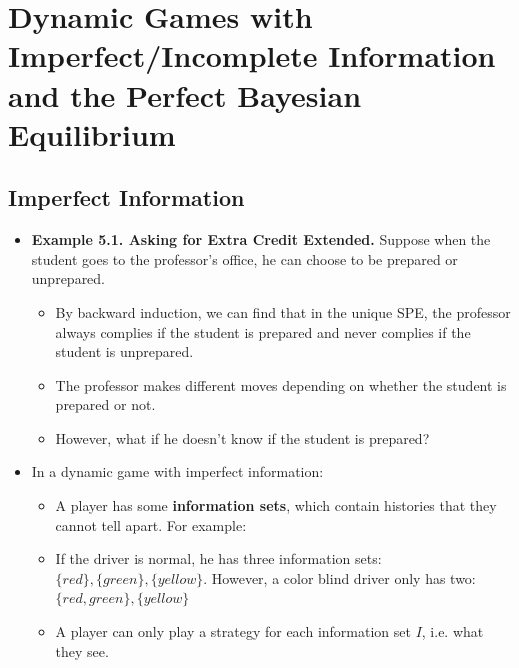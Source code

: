 \documentclass[notitlepage]{article}
\begin{document}
\section{Dynamic Games with Imperfect/Incomplete Information and the Perfect Bayesian Equilibrium}

\subsection{Imperfect Information}
\begin{itemize}
    \item \textbf{Example 5.1. Asking for Extra Credit Extended.} Suppose when the student goes to the professor's office, he can choose to be prepared or unprepared.
    \newpage
    \begin{figure}[h]
    \centering
    \resizebox{0.3\textwidth}{!}{
    
    }
    \end{figure}
    \begin{itemize}
        \item By backward induction, we can find that in the unique SPE, the professor always complies if the student is prepared and never complies if the student is unprepared.
        \item The professor makes different moves depending on whether the student is prepared or not.
        \item However, what if he doesn't know if the student is prepared?
    \end{itemize}

    \item In a dynamic game with imperfect information:
    \begin{itemize}
        \item A player has some \textbf{information sets}, which contain histories that they cannot tell apart. For example:
        
        \begin{figure}[h]
        \centering
        \resizebox{0.3\textwidth}{!}{
        
        }
        \end{figure}

        \item If the driver is normal, he has three information sets: \(\{red\}, \{green\}, \{yellow\}\). However, a color blind driver only has two: \(\{red, green\}, \{yellow\}\)
        \item A player can only play a strategy for each information set \(I\), i.e. what they see.
    \end{itemize}


\end{itemize}
\end{document}
